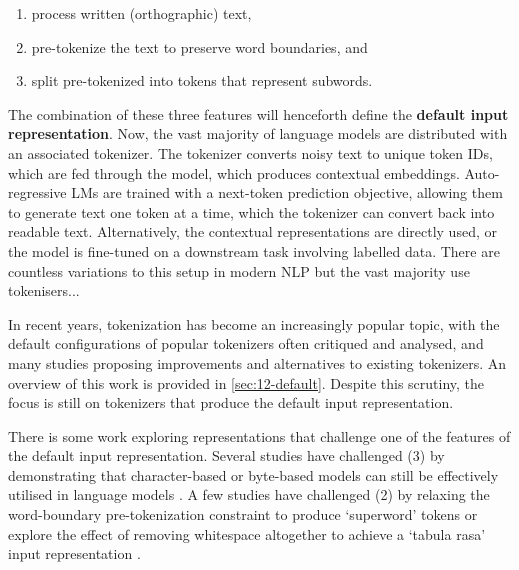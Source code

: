 

\begin{enumerate}
    \item process written (orthographic) text,
    \item pre-tokenize the text to preserve word boundaries, and
    \item split pre-tokenized into tokens that represent subwords.
\end{enumerate}

The combination of these three features will henceforth define the \textbf{default input representation}. Now, the vast majority of language models are distributed with an associated tokenizer. The tokenizer converts noisy text to unique token IDs, which are fed through the model, which produces contextual embeddings. Auto-regressive LMs are trained with a next-token prediction objective, allowing them to generate text one token at a time, which the tokenizer can convert back into readable text. Alternatively, the contextual representations are directly used, or the model is fine-tuned on a downstream task involving labelled data. There are countless variations to this setup in modern NLP but the vast majority use tokenisers...

In recent years, tokenization has become an increasingly popular topic, with the default configurations of popular tokenizers often critiqued and analysed, and many studies proposing improvements and alternatives to existing tokenizers. An overview of this work is provided in \cref{sec:12-default}. Despite this scrutiny, the focus is still on tokenizers that produce the default input representation. 

There is some work exploring representations that challenge one of the features of the default input representation. Several studies have challenged (3) by demonstrating that character-based or byte-based models can still be effectively utilised in language models \addcites. A few studies have challenged (2) by relaxing the word-boundary pre-tokenization constraint to produce `superword' tokens \addcites or explore the effect of removing whitespace altogether to achieve a `tabula rasa' input representation \addcites.

